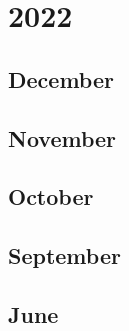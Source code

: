 \documentclass[12pt]{article}
\begin{document}
\newpage
\section{2022}
\subsection{December}
\begin{refsection}
    \nocite{iyer_opt-iml_2023}
    \printbibliography[heading=none]
\end{refsection}

\subsection{November}
\begin{refsection}
    \nocite{liang_holistic_2023}
    \nocite{workshop_bloom_2023}
    \nocite{taylor_galactica_2022}
    \printbibliography[heading=none]
\end{refsection}

\subsection{October}
\begin{refsection}
    \nocite{chung_scaling_2022}
    \nocite{zeng_glm-130b_2023}
    \printbibliography[heading=none]
\end{refsection}

\subsection{September}
\begin{refsection}
    \nocite{glaese_improving_2022}
    \printbibliography[heading=none]
\end{refsection}

\subsection{June}
\begin{refsection}
    \nocite{wei_emergent_nodate}
    \nocite{hao2022languagemodelsgeneralpurposeinterfaces}
    \nocite{noauthor_googlebig-bench_2025}
    \printbibliography[heading=none]
\end{refsection}
\end{document}
